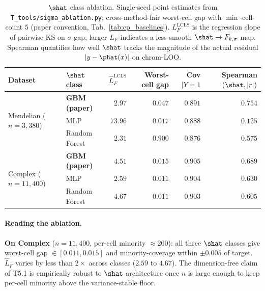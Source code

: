 \begin{table}[h]
\centering
\small
\caption{$\shat$ class ablation. Single-seed point estimates from
\texttt{T\_tools/sigma\_ablation.py}; cross-method-fair worst-cell gap with
$\min$-cell-count $5$ (paper convention, Tab.~\ref{tab:cp_baselines}).
$L_F^{\mathrm{LCLS}}$ is the regression slope of pairwise KS on $\sigma$-gap;
larger $L_F$ indicates a less smooth $\shat \to F_{k,\sigma}$ map. Spearman
quantifies how well $\shat$ tracks the magnitude of the actual residual
$|y - \phat(x)|$ on chrom-LOO.}
\label{tab:sigma_ablation}
\setlength{\tabcolsep}{4pt}
\begin{tabular}{llrrrr}
\toprule
Dataset & $\shat$ class & $\hat L_F^{\mathrm{LCLS}}$ & Worst-cell gap & Cov$|Y{=}1$ & Spearman$(\shat, |r|)$ \\
\midrule
\multirow{3}{*}{Mendelian ($n = 3{,}380$)}
 & \textbf{GBM (paper)}            & $2.97$  & $0.047$ & $0.891$ & $0.754$ \\
 & MLP                              & $73.96$ & $0.017$ & $0.888$ & $0.125$ \\
 & Random Forest                    & $2.31$  & $0.900$ & $0.876$ & $0.575$ \\
\midrule
\multirow{3}{*}{Complex ($n = 11{,}400$)}
 & \textbf{GBM (paper)}            & $4.51$  & $0.015$ & $0.905$ & $0.689$ \\
 & MLP                              & $2.59$  & $0.011$ & $0.904$ & $0.630$ \\
 & Random Forest                    & $4.67$  & $0.011$ & $0.903$ & $0.605$ \\
\bottomrule
\end{tabular}
\end{table}

\paragraph{Reading the ablation.}
\textbf{On Complex} ($n = 11{,}400$, per-cell minority $\approx 200$): all three
$\shat$ classes give worst-cell gap $\in [0.011, 0.015]$ and minority-coverage
within $\pm 0.005$ of target. $\hat L_F$ varies by less than $2\times$ across
classes ($2.59$ to $4.67$). The dimension-free claim of T5.1 is empirically
robust to $\shat$ architecture once $n$ is large enough to keep per-cell
minority above the variance-stable floor.

